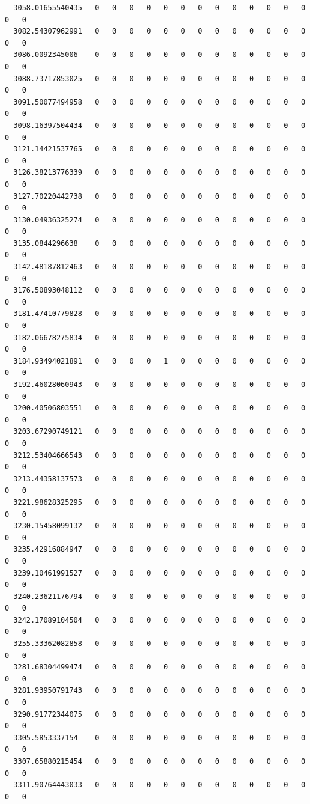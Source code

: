 \documentclass[
  letterpaper,
  DIV=11,
  numbers=noendperiod]{scrartcl}
\begin{document}
\begin{verbatim}
  3058.01655540435   0   0   0   0   0   0   0   0   0   0   0   0   0   0   0
  3082.54307962991   0   0   0   0   0   0   0   0   0   0   0   0   0   0   0
  3086.0092345006    0   0   0   0   0   0   0   0   0   0   0   0   0   0   0
  3088.73717853025   0   0   0   0   0   0   0   0   0   0   0   0   0   0   0
  3091.50077494958   0   0   0   0   0   0   0   0   0   0   0   0   0   0   0
  3098.16397504434   0   0   0   0   0   0   0   0   0   0   0   0   0   0   0
  3121.14421537765   0   0   0   0   0   0   0   0   0   0   0   0   0   0   0
  3126.38213776339   0   0   0   0   0   0   0   0   0   0   0   0   0   0   0
  3127.70220442738   0   0   0   0   0   0   0   0   0   0   0   0   0   0   0
  3130.04936325274   0   0   0   0   0   0   0   0   0   0   0   0   0   0   0
  3135.0844296638    0   0   0   0   0   0   0   0   0   0   0   0   0   0   0
  3142.48187812463   0   0   0   0   0   0   0   0   0   0   0   0   0   0   0
  3176.50893048112   0   0   0   0   0   0   0   0   0   0   0   0   0   0   0
  3181.47410779828   0   0   0   0   0   0   0   0   0   0   0   0   0   0   0
  3182.06678275834   0   0   0   0   0   0   0   0   0   0   0   0   0   0   0
  3184.93494021891   0   0   0   0   1   0   0   0   0   0   0   0   0   0   0
  3192.46028060943   0   0   0   0   0   0   0   0   0   0   0   0   0   0   0
  3200.40506803551   0   0   0   0   0   0   0   0   0   0   0   0   0   0   0
  3203.67290749121   0   0   0   0   0   0   0   0   0   0   0   0   0   0   0
  3212.53404666543   0   0   0   0   0   0   0   0   0   0   0   0   0   0   0
  3213.44358137573   0   0   0   0   0   0   0   0   0   0   0   0   0   0   0
  3221.98628325295   0   0   0   0   0   0   0   0   0   0   0   0   0   0   0
  3230.15458099132   0   0   0   0   0   0   0   0   0   0   0   0   0   0   0
  3235.42916884947   0   0   0   0   0   0   0   0   0   0   0   0   0   0   0
  3239.10461991527   0   0   0   0   0   0   0   0   0   0   0   0   0   0   0
  3240.23621176794   0   0   0   0   0   0   0   0   0   0   0   0   0   0   0
  3242.17089104504   0   0   0   0   0   0   0   0   0   0   0   0   0   0   0
  3255.33362082858   0   0   0   0   0   0   0   0   0   0   0   0   0   0   0
  3281.68304499474   0   0   0   0   0   0   0   0   0   0   0   0   0   0   0
  3281.93950791743   0   0   0   0   0   0   0   0   0   0   0   0   0   0   0
  3290.91772344075   0   0   0   0   0   0   0   0   0   0   0   0   0   0   0
  3305.5853337154    0   0   0   0   0   0   0   0   0   0   0   0   0   0   0
  3307.65880215454   0   0   0   0   0   0   0   0   0   0   0   0   0   0   0
  3311.90764443033   0   0   0   0   0   0   0   0   0   0   0   0   0   0   0
                  

\end{verbatim}
\end{document}
